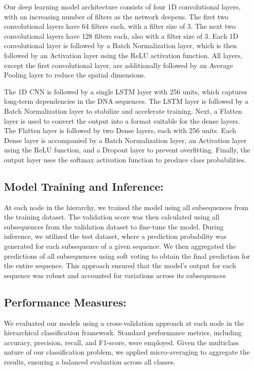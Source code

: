 Our deep learning model architecture consists of four 1D convolutional layers, with an increasing number of filters as the network deepens. The first two convolutional layers have 64 filters each, with a filter size of 3. The next two convolutional layers have 128 filters each, also with a filter size of 3. Each 1D convolutional layer is followed by a Batch Normalization layer, which is then followed by an Activation layer using the ReLU activation function. All layers, except the first convolutional layer, are additionally followed by an Average Pooling layer to reduce the spatial dimensions.

The 1D CNN is followed by a single LSTM layer with 256 units, which captures long-term dependencies in the DNA sequences. The LSTM layer is followed by a Batch Normalization layer to stabilize and accelerate training. Next, a Flatten layer is used to convert the output into a format suitable for the dense layers. The Flatten layer is followed by two Dense layers, each with 256 units. Each Dense layer is accompanied by a Batch Normalization layer, an Activation layer using the ReLU function, and a Dropout layer to prevent overfitting. Finally, the output layer uses the softmax activation function to produce class probabilities.
  
\subsection{Model Training and Inference:}
At each node in the hierarchy, we trained the model using all subsequences from the training dataset. The validation score was then calculated using all subsequences from the validation dataset to fine-tune the model. During inference, we utilized the test dataset, where a prediction probability was generated for each subsequence of a given sequence. We then aggregated the predictions of all subsequences using soft voting to obtain the final prediction for the entire sequence. This approach ensured that the model's output for each sequence was robust and accounted for variations across its subsequences



\subsection{Performance Measures:}
We evaluated our models using a cross-validation approach at each node in the hierarchical classification framework. Standard performance metrics, including accuracy, precision, recall, and F1-score, were employed. Given the multiclass nature of our classification problem, we applied micro-averaging to aggregate the results, ensuring a balanced evaluation across all classes.

